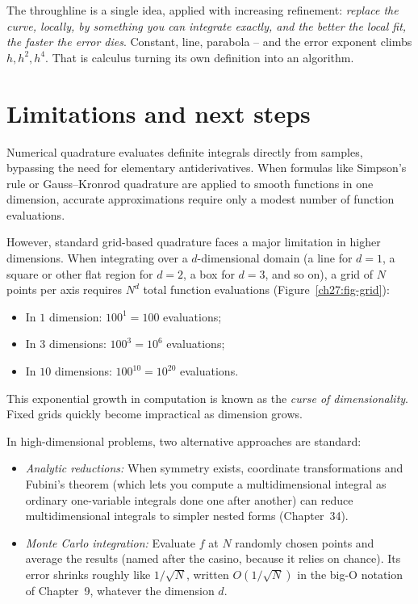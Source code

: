 The throughline is a single idea, applied with increasing refinement: \emph{replace the curve, locally, by something you can integrate exactly, and the better the local fit, the faster the error dies}. Constant, line, parabola -- and the error exponent climbs $h, h^2, h^4$. That is calculus turning its own definition into an algorithm.

\section{Limitations and next steps}
\label{ch27:reach}

\begin{connectionbox}
Numerical quadrature evaluates definite integrals directly from samples, bypassing
the need for elementary antiderivatives. When formulas like Simpson's rule or
Gauss--Kronrod quadrature are applied to smooth functions in one dimension, accurate
approximations require only a modest number of function evaluations.

However, standard grid-based quadrature faces a major limitation in higher dimensions.
When integrating over a $d$-dimensional domain (a line for $d=1$, a square or other flat region for $d=2$, a box for $d=3$, and so on), a grid of $N$ points per axis requires
$N^d$ total function evaluations (Figure~\ref{ch27:fig-grid}):
\begin{itemize}
  \item In $1$ dimension: $100^1 = 100$ evaluations;
  \item In $3$ dimensions: $100^3 = 10^6$ evaluations;
  \item In $10$ dimensions: $100^{10} = 10^{20}$ evaluations.
\end{itemize}
This exponential growth in computation is known as the \emph{curse of dimensionality}.
Fixed grids quickly become impractical as dimension grows.

In high-dimensional problems, two alternative approaches are standard:
\begin{itemize}
  \item \emph{Analytic reductions:} When symmetry exists, coordinate transformations
  and Fubini's theorem (which lets you compute a multidimensional integral as ordinary
  one-variable integrals done one after another) can reduce multidimensional integrals to simpler nested forms
  (Chapter~34).
  \item \emph{Monte Carlo integration:} Evaluate $f$ at $N$ randomly chosen points and
  average the results (named after the casino, because it relies on chance). Its error
  shrinks roughly like $1/\sqrt{N}$, written $O(1/\sqrt{N})$ in the big-O notation of Chapter~9, whatever the dimension $d$.
\end{itemize}
\end{connectionbox}

